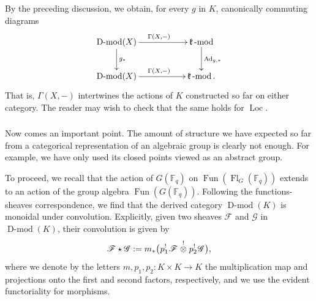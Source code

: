 \documentclass[10pt]{amsart}
\newcommand{\sB}{\on{Fl}_G}
\newcommand{\on}{\operatorname}
\renewcommand{\mod}{\on{-mod}}
\newcommand{\Dmod}{\on{D-mod}}
\newcommand{\Fq}{\mathbb{F}_q}
\newcommand{\Fun}{\on{Fun}}
\theoremstyle{remark}
\newcommand{\fk}{\mathfrak{k}}
\newcommand{\sF}{\mathscr{F}}
\newcommand{\sG}{\mathscr{G}}
\numberwithin{equation}{section}
\renewcommand{\mod}{\operatorname{-mod}}
\begin{document}
	\subsubsection{} By the preceding discussion, we obtain, for every $g$ in 
	$K$, 
	canonically commuting diagrams 
	\[
	\xymatrix{\Dmod(X) \ar[d]^{g_*} \ar[rr]^{\Gamma(X, -)} && \fk\mod 
	\ar[d]^{\on{Ad}_{g, *}} \\ \Dmod(X) \ar[rr]^{\Gamma(X, -)} & &
	\fk\mod. }
	\]
	That is, $\Gamma(X, -)$ intertwines the actions of $K$ constructed so far 
	on either category. The reader may wish to check that the same holds for 
	$\on{Loc}$. 	

	
	
	
	\subsubsection{}Now comes an important point. The amount of structure we 
	have expected so far from a categorical representation of an algebraic group is clearly not 
	enough. For example, we have only used its closed points viewed as an abstract group. 
	
	
	To proceed, we recall that the action of $G(\Fq)$ on $\Fun(\sB(\Fq))$ 
	extends to an action of the group algebra $\Fun(G(\Fq))$. Following the 
	functions-sheaves correspondence, we find that the derived category 
	$\Dmod(K)$ is monoidal under convolution. Explicitly, 
	given 
	two sheaves $\sF$ and $\sG$ in $\Dmod(K)$, their convolution is given by 
	\begin{equation} \label{e:convalgdmod}
	  \sF \star \sG := m_*\big( \hspace{.2mm} p_1^! \hspace{.2mm}\sF 
	  \hspace{.2mm}\overset{!}{\otimes}\hspace{.2mm} p_2^! \hspace{.2mm}\sG 
	  \hspace{.2mm} 
	  \big),
	\end{equation}
	where we denote by the letters $m, p_1, p_2: K \times K \rightarrow K$  
	the multiplication 
	map and projections onto the first and second factors, respectively, and we 
	use the evident functoriality for morphisms. 
	
\end{document}
